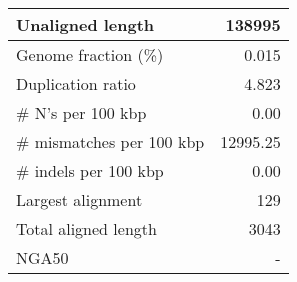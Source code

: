 \documentclass[12pt,a4paper]{article}
\begin{document}
\begin{table}[ht]
\begin{center}
\begin{tabular}{|l*{1}{|r}|}
Unaligned length & 138995 \\ \hline
Genome fraction (\%) & 0.015 \\ \hline
Duplication ratio & 4.823 \\ \hline
\# N's per 100 kbp & 0.00 \\ \hline
\# mismatches per 100 kbp & 12995.25 \\ \hline
\# indels per 100 kbp & 0.00 \\ \hline
Largest alignment & 129 \\ \hline
Total aligned length & 3043 \\ \hline
NGA50 & - \\ \hline
\end{tabular}
\end{center}
\end{table}
\end{document}
